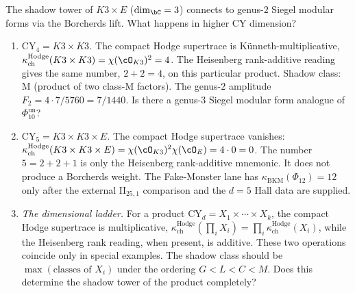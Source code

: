 \begin{openproblem}
\label{op:programme-i-higher-dim}
The shadow tower of $K3 \times E$ ($\dim_\bC = 3$) connects
to genus-$2$ Siegel modular forms via the Borcherds lift.
What happens in higher CY dimension?
\begin{enumerate}[label=\textup{(\roman*)}]
\item \emph{$\mathrm{CY}_4 = K3 \times K3$.} The compact Hodge supertrace
 is K\"unneth-multiplicative,
 $\kappa_{\mathrm{ch}}^{\mathrm{Hodge}}(K3\times K3)=
 \chi(\cO_{K3})^2=4$. The Heisenberg rank-additive reading gives the
 same number, $2+2=4$, on this particular product.
 Shadow class: M (product of two class-M factors).
 The genus-$2$ amplitude $F_2 = 4 \cdot 7/5760 = 7/1440$.
 Is there a genus-$3$ Siegel modular form analogue of
 \(\Phi_{10}^{\mathrm{un}}\)?
\item \emph{$\mathrm{CY}_5 = K3 \times K3 \times E$.}
 The compact Hodge supertrace vanishes:
 $\kappa_{\mathrm{ch}}^{\mathrm{Hodge}}(K3\times K3\times E)
 = \chi(\cO_{K3})^2\chi(\cO_E)=4\cdot 0=0$. The number $5=2+2+1$
 is only the Heisenberg rank-additive mnemonic. It does not produce a
 Borcherds weight. The Fake-Monster lane has
 $\kappa_{\mathrm{BKM}}(\Phi_{12})=12$ only after the external
 $\mathrm{II}_{25,1}$ comparison and the $d=5$ Hall data are supplied.
\item \emph{The dimensional ladder.} For a product
 $\mathrm{CY}_d = X_1 \times \cdots \times X_k$,
 the compact Hodge supertrace is multiplicative,
 $\kappa_{\mathrm{ch}}^{\mathrm{Hodge}}(\prod_i X_i)=
 \prod_i\kappa_{\mathrm{ch}}^{\mathrm{Hodge}}(X_i)$, while the
 Heisenberg rank reading, when present, is additive. These two
 operations coincide only in special examples.
 The shadow class should be
 $\max(\text{classes of } X_i)$ under the ordering
 $G < L < C < M$. Does this determine the shadow
 tower of the product completely?
\end{enumerate}
\end{openproblem}

